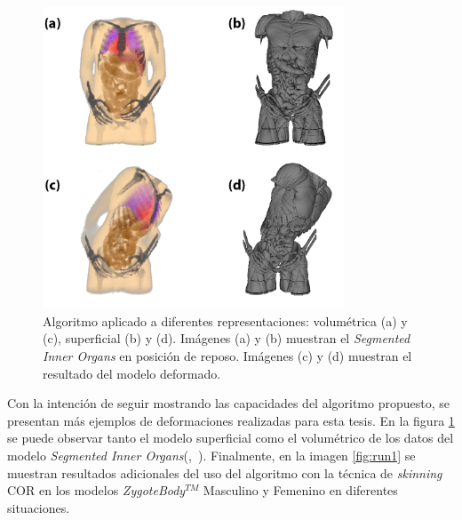 \begin{figure}[!ht]%
   \centering
   \includegraphics[width=0.8\textwidth]{IMG/HV}
    \caption{Algoritmo aplicado a diferentes representaciones: volumétrica (a) y (c), superficial (b) y (d). Imágenes (a) y (b) muestran el \emph{Segmented Inner Organs} en posición de reposo. Imágenes (c) y (d) muestran el resultado del modelo deformado.}
    \label{fig:humanvisible}
\end{figure}

Con la intención de seguir mostrando las capacidades del algoritmo propuesto, se presentan más ejemplos de deformaciones realizadas para esta tesis. En la figura \ref{fig:humanvisible} se puede observar tanto el modelo superficial como el volumétrico de los datos del modelo \emph{Segmented Inner Organs}(\cite{VM2002},~\cite{VoxelMan}).
%
Finalmente, en la imagen \ref{fig:run1} se muestran resultados adicionales del uso del algoritmo con la técnica de \emph{skinning} \ac{COR} en los modelos \emph{ZygoteBody}$^{TM}$ Masculino y Femenino en diferentes situaciones.

